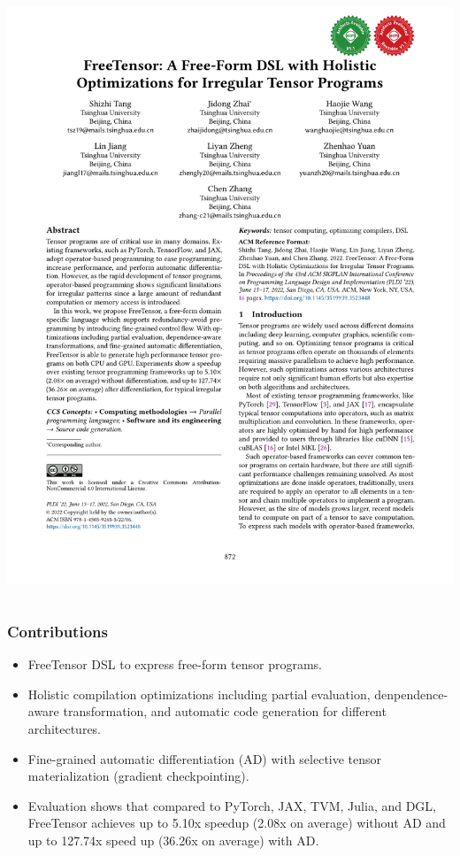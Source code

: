 \documentclass[12pt,aspectratio=169]{beamer}
\begin{document}
\begin{frame}
\begin{columns}
\begin{column}{0.5\textwidth}
                \includegraphics[page=2,trim=1.95cm 18.2cm 10.5cm 2.2cm,clip,scale=.8]{paper.pdf}
            \end{column}
        \end{columns}
    \end{frame}

    \begin{frame}
        \frametitle{Contributions}

        \begin{itemize}
            \setlength{\itemsep}{.8em}
            \item FreeTensor DSL to express free-form tensor programs.
            \item Holistic compilation optimizations including partial evaluation, denpendence-aware transformation, and automatic code generation for different architectures.
            \item Fine-grained automatic differentiation (AD) with selective tensor materialization (gradient checkpointing).
            \item Evaluation shows that compared to PyTorch, JAX, TVM, Julia, and DGL, FreeTensor achieves up to 5.10x speedup (2.08x on average) without AD and up to 127.74x speed up (36.26x on average) with AD.
        \end{itemize}
    \end{frame}
\end{document}
